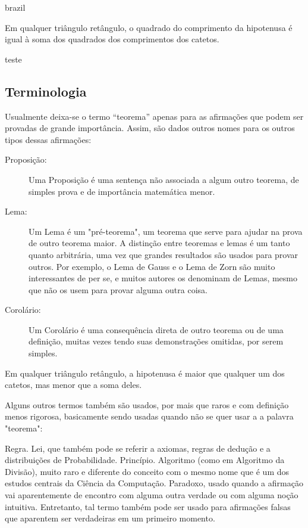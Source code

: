 \begin{otherlanguage*}{brazil}
\begin{teorema}
    Em qualquer triângulo retângulo, o quadrado do comprimento da hipotenusa é igual à soma dos quadrados dos comprimentos dos catetos.
\end{teorema}
\begin{proposicao}
teste
\end{proposicao}
\subsection{Terminologia}



Usualmente deixa-se o termo ``teorema'' apenas para as afirmações que podem ser provadas de grande importância. Assim, são dados outros nomes para os outros tipos dessas afirmações:

\begin{description}
    \item[Proposição:] Uma Proposição é uma sentença não associada a algum outro teorema, de simples prova e de importância matemática menor.
    \item[Lema:] Um Lema é um "pré-teorema", um teorema que serve para ajudar na prova de outro teorema maior. A distinção entre teoremas e lemas é um tanto quanto arbitrária, uma vez que grandes resultados são usados para provar outros. Por exemplo, o Lema de Gauss e o Lema de Zorn são muito interessantes de per se, e muitos autores os denominam de Lemas, mesmo que não os usem para provar alguma outra coisa.
    \item[Corolário:] Um Corolário é uma consequência direta de outro teorema ou de uma definição, muitas vezes tendo suas demonstrações omitidas, por serem simples.
\end{description}


\begin{corolario}
    Em qualquer triângulo retângulo, a hipotenusa é maior que qualquer um dos catetos, mas menor que a soma deles.
\end{corolario}

Alguns outros termos também são usados, por mais que raros e com definição menos rigorosa, basicamente sendo usadas quando não se quer usar a a palavra "teorema":

Regra.
Lei, que também pode se referir a axiomas, regras de dedução e a distribuições de Probabilidade.
Princípio.
Algoritmo (como em Algoritmo da Divisão), muito raro e diferente do conceito com o mesmo nome que é um dos estudos centrais da Ciência da Computação.
Paradoxo, usado quando a afirmação vai aparentemente de encontro com alguma outra verdade ou com alguma noção intuitiva. Entretanto, tal termo também pode ser usado para afirmações falsas que aparentem ser verdadeiras em um primeiro momento.


\end{otherlanguage*}
